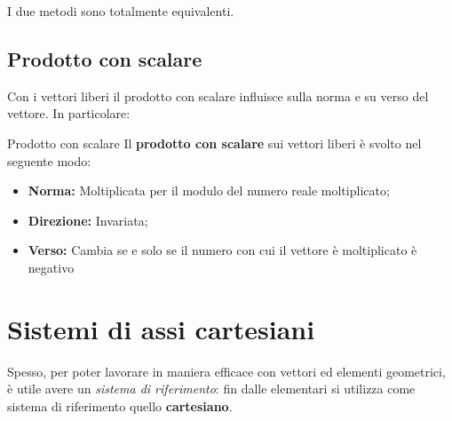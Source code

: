 I due metodi sono totalmente equivalenti.

\subsection{Prodotto con scalare}
Con i vettori liberi il prodotto con scalare influisce sulla norma e su verso del vettore. In particolare:
\begin{teo}{Prodotto con scalare}
    Il \textbf{prodotto con scalare} sui vettori liberi è svolto nel seguente modo:
    \begin{itemize}
        \item \textbf{Norma:} Moltiplicata per il modulo del numero reale moltiplicato;
        \item \textbf{Direzione: } Invariata;
        \item \textbf{Verso: } Cambia se e solo se il numero con cui il vettore è moltiplicato è negativo
    \end{itemize}
\end{teo}
\begin{center}
    \tikzset{external/export = true}
    \tikzset{external/export = false}
\end{center}

\section{Sistemi di assi cartesiani}
Spesso, per poter lavorare in maniera efficace con vettori ed elementi geometrici, è utile avere un \textit{sistema di riferimento}: fin dalle elementari si utilizza come sistema di riferimento quello \textbf{cartesiano}.

